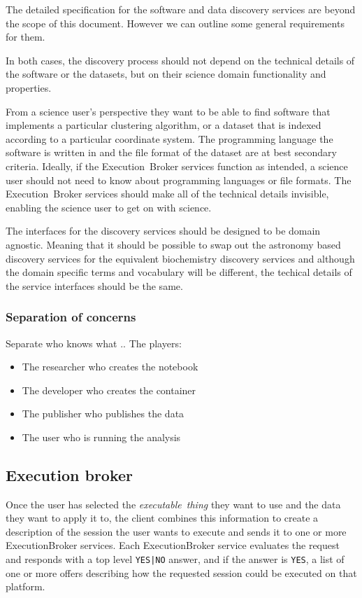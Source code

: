 \documentclass[11pt,a4paper]{ivoa}
\newcommand{\execbrokerclass} {ExecutionBroker}
\newcommand{\executionbroker} {Execution~Broker}
\newcommand{\codeword}[1] {\texttt{#1}}
\newcommand{\dataset}[1] {dataset#1}
\newcommand{\executablething}[1] {\textit{executable~thing#1}}
\begin{document}
The detailed specification for the software and data discovery services are beyond the
scope of this document.
However we can outline some general requirements for them.

In both cases, the discovery process should not depend on the technical details
of the software or the \dataset{s}, but on their science domain functionality and properties.

From a science user's perspective they want to be able to find software that implements
a particular clustering algorithm, or a \dataset{} that is indexed according to a particular
coordinate system.
The programming language the software is written in and the file format of the \dataset{}
are at best secondary criteria.
Ideally, if the \executionbroker{} services function as intended, a science user should not
need to know about programming languages or file formats.
The \executionbroker{} services should make all of the technical details invisible,
enabling the science user to get on with science.

The interfaces for the discovery services should be designed to be domain agnostic.
Meaning that it should be possible to swap out the astronomy based discovery services
for the equivalent biochemistry discovery services and although the domain specific
terms and vocabulary will be different, the techical details of the service interfaces
should be the same.

\subsubsection{Separation of concerns}
\label{separate-concerns}

Separate who knows what ..
The players:
\begin{itemize}
    \item The researcher who creates the notebook
    \item The developer who creates the container
    \item The publisher who publishes the data
    \item The user who is running the analysis
\end{itemize}

\subsection{Execution broker}
\label{execution-broker-desc}

Once the user has selected the \executablething{} they want to use and the
data they want to apply it to, the client combines this information to create a
description of the session the user wants to execute and sends it to one or more
\execbrokerclass{} services.
Each \execbrokerclass{} service evaluates the request and responds with a top level
\codeword{YES|NO} answer, and if
the answer is \codeword{YES}, a list of one or more offers describing how
the requested session could be executed on that platform.
\end{document}
